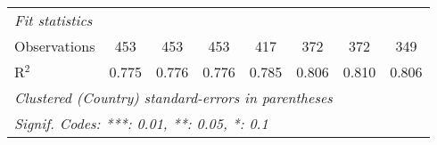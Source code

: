 \begin{tabular}{lccccccc}
   \midrule \emph{Fit statistics}\\
   Observations                                                                   & 453          & 453          & 453          & 417           & 372           & 372           & 349\\  
   R$^2$                                                                          & 0.775        & 0.776        & 0.776        & 0.785         & 0.806         & 0.810         & 0.806\\  
   \midrule
   \multicolumn{8}{l}{\emph{Clustered (Country) standard-errors in parentheses}}\\
   \multicolumn{8}{l}{\emph{Signif. Codes: ***: 0.01, **: 0.05, *: 0.1}}\\
\end{tabular}
\par\endgroup


